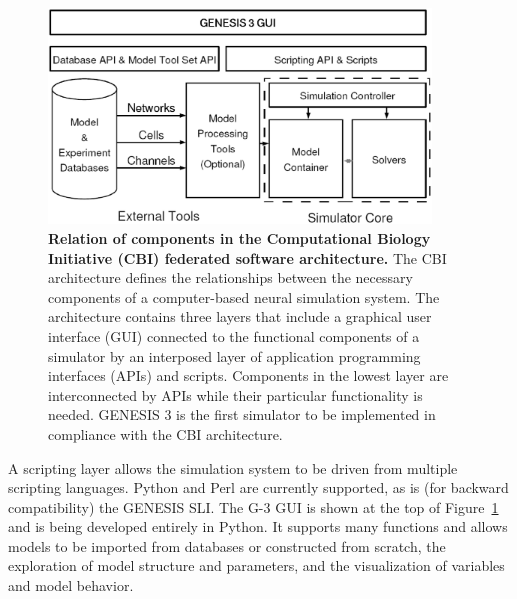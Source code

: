 \documentclass[10pt]{article}
\begin{document}
\begin{figure}[ht]
  \begin{center}
    \includegraphics[width=4in]{figures/G3arch.eps}
  \end{center}
  \caption{ {\bf Relation of components in the Computational Biology
      Initiative (CBI) federated software architecture.} The CBI
    architecture defines the relationships between the necessary
    components of a computer-based neural simulation system. The
    architecture contains three layers that include a graphical user
    interface (GUI) connected to the functional components of a
    simulator by an interposed layer of application programming
    interfaces (APIs) and scripts. Components in the lowest layer are
    interconnected by APIs while their particular functionality is
    needed. GENESIS 3 is the first simulator to be implemented in
    compliance with the CBI architecture.  }
  \label{fig:cbi-arch}
\end{figure}

A scripting layer allows the simulation system to be driven from
multiple scripting languages. Python and Perl are currently supported,
as is (for backward compatibility) the GENESIS SLI. The G-3 GUI is
shown at the top of Figure~\ref{fig:cbi-arch} and is being developed
entirely in Python.  It supports many functions and allows models to
be imported from databases or constructed from scratch, the
exploration of model structure and parameters, and the visualization
of variables and model behavior.
\end{document}
